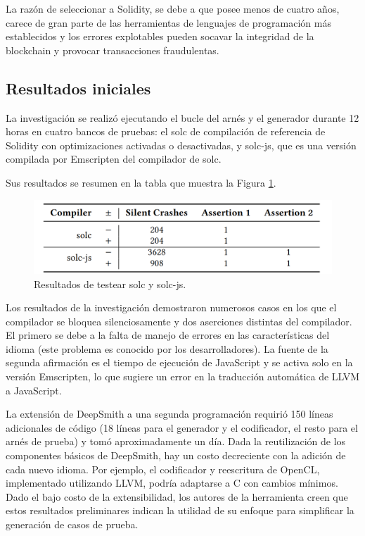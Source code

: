 La razón de seleccionar a Solidity, se debe a que posee menos de cuatro años, carece de gran parte de las herramientas de lenguajes de programación más establecidos y los errores explotables pueden socavar la integridad de la blockchain y provocar transacciones fraudulentas. 

\subsection{Resultados iniciales}
La investigación se realizó ejecutando el bucle del arnés y el generador durante 12 horas en cuatro bancos de pruebas: el solc de compilación de referencia de Solidity con optimizaciones activadas o desactivadas, y solc-js, que es una versión compilada por Emscripten del compilador de solc.

Sus resultados se resumen en la tabla que muestra la Figura \ref{fig:deepsmith solc}.

\begin{figure}[h]
    \centering
    \includegraphics[scale=0.3]{images/deepsmithsolc.png}
    \caption{Resultados de testear solc y solc-js.}
    \label{fig:deepsmith solc}
\end{figure}


Los resultados de la investigación demostraron numerosos casos en los que el compilador se bloquea silenciosamente y dos aserciones distintas del compilador. El primero se debe a la falta de manejo de errores en las características del idioma (este problema es conocido por los desarrolladores). La fuente de la segunda afirmación es el tiempo de ejecución de JavaScript y se activa solo en la versión Emscripten, lo que sugiere un error en la traducción automática de LLVM a JavaScript.

La extensión de DeepSmith a una segunda programación requirió 150 líneas adicionales de código (18 líneas para el generador y el codificador, el resto para el arnés de prueba) y tomó aproximadamente un día. Dada la reutilización de los componentes básicos de DeepSmith, hay un costo decreciente con la adición de cada nuevo idioma. Por ejemplo, el codificador y reescritura de OpenCL, implementado utilizando LLVM, podría adaptarse a C con cambios mínimos. Dado el bajo costo de la extensibilidad, los autores de la herramienta creen que estos resultados preliminares indican la utilidad de su enfoque para simplificar la generación de casos de prueba.

